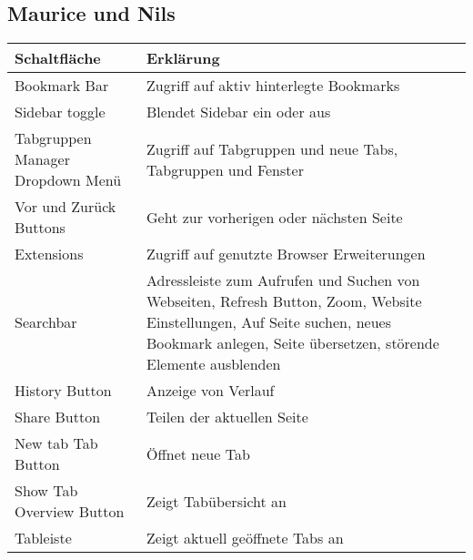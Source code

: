 \documentclass[a4paper,10pt]{article}
\begin{document}
    \subsection{Maurice und Nils}
    \begin{tabular}{|p{5cm}|p{9cm}|}
        \hline
        \textbf{Schaltfläche} & \textbf{Erklärung} \\
        \hline
        Bookmark Bar & Zugriff auf aktiv hinterlegte Bookmarks \\
        \hline
        Sidebar toggle & Blendet Sidebar ein oder aus \\
        \hline
        Tabgruppen Manager Dropdown Menü & Zugriff auf Tabgruppen und neue Tabs, Tabgruppen und Fenster \\
        \hline
        Vor und Zurück Buttons & Geht zur vorherigen oder nächsten Seite \\
        \hline
        Extensions & Zugriff auf genutzte Browser Erweiterungen \\
        \hline
        Searchbar & Adressleiste zum Aufrufen und Suchen von Webseiten, Refresh Button, Zoom, Website Einstellungen, Auf Seite suchen, neues Bookmark anlegen, Seite übersetzen, störende Elemente ausblenden \\
        \hline
        History Button & Anzeige von Verlauf \\
        \hline
        Share Button & Teilen der aktuellen Seite \\
        \hline
        New tab Tab Button & Öffnet neue Tab \\
        \hline
        Show Tab Overview Button & Zeigt Tabübersicht an \\
        \hline
        Tableiste & Zeigt aktuell geöffnete Tabs an \\
        \hline
    \end{tabular}
\end{document}
